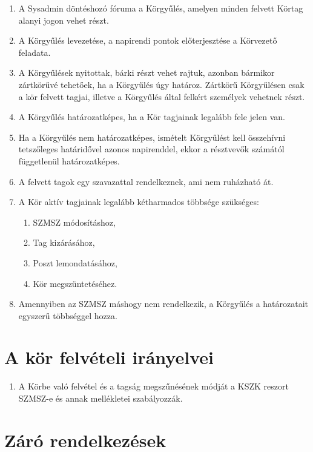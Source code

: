 \documentclass[12pt]{article}
\begin{document}
\begin{enumerate}
\item A Sysadmin döntéshozó fóruma a Körgyűlés, amelyen minden felvett Körtag alanyi jogon vehet részt.
\item A Körgyűlés levezetése, a napirendi pontok előterjesztése a Körvezető feladata.
\item A Körgyűlések nyitottak, bárki részt vehet rajtuk, azonban bármikor zártkörűvé tehetőek, ha a Körgyűlés úgy határoz. Zártkörű Körgyűlésen csak a kör felvett tagjai, illetve a Körgyűlés által felkért személyek vehetnek részt.
\item A Körgyűlés határozatképes, ha a Kör tagjainak legalább fele jelen van.
\item Ha a Körgyűlés nem határozatképes, ismételt Körgyűlést kell összehívni tetszőleges határidővel azonos napirenddel, ekkor a résztvevők számától függetlenül határozatképes.
\item A felvett tagok egy szavazattal rendelkeznek, ami nem ruházható át.
\item A Kör aktív tagjainak legalább kétharmados többsége szükséges:
  \begin{enumerate}
    \item SZMSZ módosításhoz,
    \item Tag kizárásához,
    \item Poszt lemondatásához,
    \item Kör megszüntetéséhez.
  \end{enumerate}
\item Amennyiben az SZMSZ máshogy nem rendelkezik, a Körgyűlés a határozatait egyszerű többséggel hozza.
\end{enumerate}


\section{A kör felvételi irányelvei}

\begin{enumerate}
\item A Körbe való felvétel és a tagság megszűnésének módját a KSZK reszort SZMSZ-e és annak mellékletei szabályozzák.
\end{enumerate}


\section{Záró rendelkezések}
\end{document}
